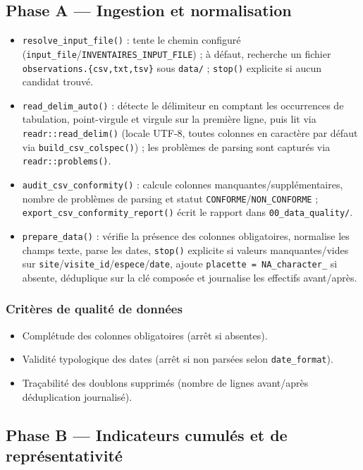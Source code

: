\documentclass[11pt,a4paper]{article}
\begin{document}
\subsection{Phase A --- Ingestion et normalisation}
\begin{itemize}[leftmargin=1.2cm]
  \item \texttt{resolve\_input\_file()} : tente le chemin configuré (\texttt{input\_file}/\texttt{INVENTAIRES\_INPUT\_FILE}) ; à défaut, recherche un fichier \texttt{observations.\{csv,txt,tsv\}} sous \texttt{data/} ; \texttt{stop()} explicite si aucun candidat trouvé.
  \item \texttt{read\_delim\_auto()} : détecte le délimiteur en comptant les occurrences de tabulation, point-virgule et virgule sur la première ligne, puis lit via \texttt{readr::read\_delim()} (locale UTF-8, toutes colonnes en caractère par défaut via \texttt{build\_csv\_colspec()}) ; les problèmes de parsing sont capturés via \texttt{readr::problems()}.
  \item \texttt{audit\_csv\_conformity()} : calcule colonnes manquantes/supplémentaires, nombre de problèmes de parsing et statut \texttt{CONFORME}/\texttt{NON\_CONFORME} ; \texttt{export\_csv\_conformity\_report()} écrit le rapport dans \texttt{00\_data\_quality/}.
  \item \texttt{prepare\_data()} : vérifie la présence des colonnes obligatoires, normalise les champs texte, parse les dates, \texttt{stop()} explicite si valeurs manquantes/vides sur \texttt{site}/\texttt{visite\_id}/\texttt{espece}/\texttt{date}, ajoute \texttt{placette = NA\_character\_} si absente, déduplique sur la clé composée et journalise les effectifs avant/après.
\end{itemize}

\subsubsection{Critères de qualité de données}
\begin{itemize}[leftmargin=1.2cm]
  \item Complétude des colonnes obligatoires (arrêt si absentes).
  \item Validité typologique des dates (arrêt si non parsées selon \texttt{date\_format}).
  \item Traçabilité des doublons supprimés (nombre de lignes avant/après déduplication journalisé).
\end{itemize}

\subsection{Phase B --- Indicateurs cumulés et de représentativité}
\end{document}
